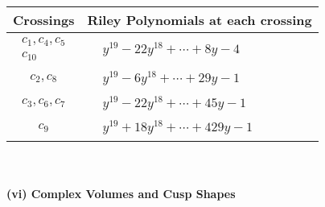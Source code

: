 \documentclass[1p]{elsarticle_modified}
\theoremstyle{definition}
\begin{document}
\begin{tabular}{m{50pt}|m{274pt}}
Crossings & \hspace{64pt}Riley Polynomials at each crossing \\
\hline $$\begin{aligned}c_{1},c_{4},c_{5}\\c_{10}\end{aligned}$$&$\begin{aligned}
&y^{19}-22 y^{18}+\cdots+8 y-4
\end{aligned}$\\
\hline $$\begin{aligned}c_{2},c_{8}\end{aligned}$$&$\begin{aligned}
&y^{19}-6 y^{18}+\cdots+29 y-1
\end{aligned}$\\
\hline $$\begin{aligned}c_{3},c_{6},c_{7}\end{aligned}$$&$\begin{aligned}
&y^{19}-22 y^{18}+\cdots+45 y-1
\end{aligned}$\\
\hline $$\begin{aligned}c_{9}\end{aligned}$$&$\begin{aligned}
&y^{19}+18 y^{18}+\cdots+429 y-1
\end{aligned}$\\
\hline
\end{tabular}\\~\\
\newpage\flushleft \textbf{(vi) Complex Volumes and Cusp Shapes}
\end{document}
